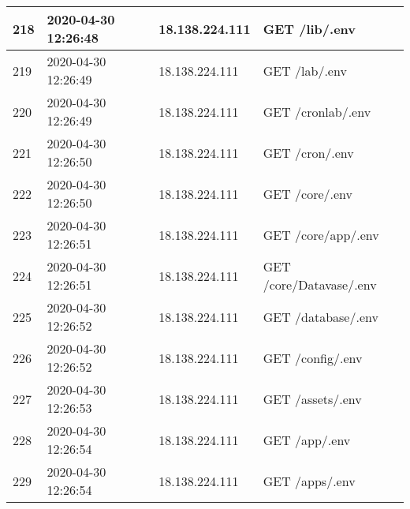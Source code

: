 \documentclass[12pt]{article}
\begin{document}
\begin{longtable}{|l|l|l|l|}
218 & 2020-04-30 12:26:48 & 18.138.224.111  & GET /lib/.env                                                                                                                       \\ \hline
219 & 2020-04-30 12:26:49 & 18.138.224.111  & GET /lab/.env                                                                                                                       \\ \hline
220 & 2020-04-30 12:26:49 & 18.138.224.111  & GET /cronlab/.env                                                                                                                   \\ \hline
221 & 2020-04-30 12:26:50 & 18.138.224.111  & GET /cron/.env                                                                                                                      \\ \hline
222 & 2020-04-30 12:26:50 & 18.138.224.111  & GET /core/.env                                                                                                                      \\ \hline
223 & 2020-04-30 12:26:51 & 18.138.224.111  & GET /core/app/.env                                                                                                                  \\ \hline
224 & 2020-04-30 12:26:51 & 18.138.224.111  & GET /core/Datavase/.env                                                                                                             \\ \hline
225 & 2020-04-30 12:26:52 & 18.138.224.111  & GET /database/.env                                                                                                                  \\ \hline
226 & 2020-04-30 12:26:52 & 18.138.224.111  & GET /config/.env                                                                                                                    \\ \hline
227 & 2020-04-30 12:26:53 & 18.138.224.111  & GET /assets/.env                                                                                                                    \\ \hline
228 & 2020-04-30 12:26:54 & 18.138.224.111  & GET /app/.env                                                                                                                       \\ \hline
229 & 2020-04-30 12:26:54 & 18.138.224.111  & GET /apps/.env                                                                                                                      \\ \hline

\end{longtable}
\end{document}
